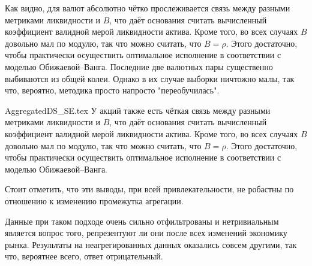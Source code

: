 Как видно, для валют абсолютно чётко прослеживается связь между разными метриками ликвидности и $B$,
что даёт основания считать вычисленный коэффициент валидной мерой ликвидности актива. Кроме того, 
во всех случаях $B$ довольно мал по модулю, так что можно считать, что $B = \rho$. Этого достаточно,
чтобы практически осуществить оптимальное исполнение в соответствии с моделью Обижаевой--Ванга.
Последние две валютных пары существенно выбиваются из общей колеи. Однако в их случае выборки ничтожно малы,
так что, вероятно, методика просто напросто "переобучилась".
\par
{AggregatedDS_SE.tex}
У акций также есть чёткая связь между разными метриками ликвидности и $B$,
что даёт основания считать вычисленный коэффициент валидной мерой ликвидности актива. Кроме того, 
во всех случаях $B$ довольно мал по модулю, так что можно считать, что $B = \rho$. Этого достаточно,
чтобы практически осуществить оптимальное исполнение в соответствии с моделью Обижаевой--Ванга.
\par
Стоит отметить, что эти выводы, при всей привлекательности, не робастны по отношению к изменению промежутка 
агрегации. 
\par
Данные при таком подходе очень сильно отфильтрованы и нетривиальным является вопрос того,
репрезентуют ли они после всех изменений экономику рынка. Результаты на неагрегированных 
данных оказались совсем другими, так что, вероятнее всего, ответ отрицательный.



